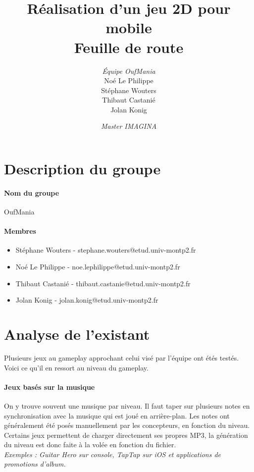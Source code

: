 \documentclass[a4paper,11pt]{article}
\begin{document}
\title{\textbf{Réalisation d'un jeu 2D pour mobile}\\Feuille de route}
\author{\textit{Équipe OufMania}\\Noé Le Philippe\\Stéphane Wouters\\Thibaut Castanié\\Jolan Konig}
\date{\textit{Master IMAGINA}}

\maketitle
\thispagestyle{empty}

\newpage 

\tableofcontents

\newpage 

\section{Description du groupe}
\paragraph{Nom du groupe}
OufMania
\paragraph{Membres}
\begin{itemize}
\item Stéphane Wouters - stephane.wouters@etud.univ-montp2.fr
\item Noé Le Philippe - noe.lephilippe@etud.univ-montp2.fr
\item Thibaut Castanié - thibaut.castanie@etud.univ-montp2.fr
\item Jolan Konig - jolan.konig@etud.univ-montp2.fr
\end{itemize}
\section{Analyse de l'existant}
Plusieurs jeux au gameplay approchant celui visé par l’équipe ont étés testés. Voici ce qu’il en ressort au niveau du gameplay.
\paragraph{Jeux basés sur la musique}
On y trouve souvent une musique par niveau. Il faut taper sur plusieurs notes en synchronisation avec la musique qui est joué en arrière-plan. Les notes ont généralement été posés manuellement par les concepteurs, en fonction du niveau. Certains jeux permettent de charger directement ses propres MP3, la génération du niveau est donc faite à la volée en fonction du fichier.\\
\textit{Exemples : Guitar Hero sur console, TapTap sur iOS et applications de promotions d’album.}
\end{document}
